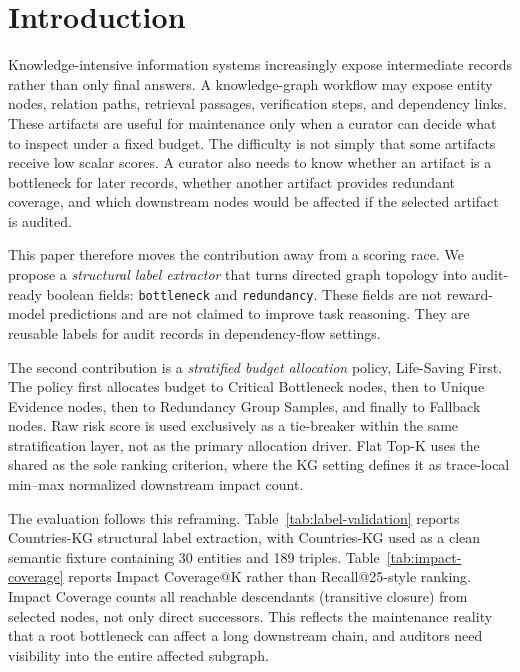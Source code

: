 \documentclass[pdflatex,sn-mathphys-num]{sn-jnl}
\begin{document}
\section{Introduction}\label{sec:introduction}

Knowledge-intensive information systems increasingly expose intermediate records rather than only final answers. A knowledge-graph workflow may expose entity nodes, relation paths, retrieval passages, verification steps, and dependency links. These artifacts are useful for maintenance only when a curator can decide what to inspect under a fixed budget. The difficulty is not simply that some artifacts receive low scalar scores. A curator also needs to know whether an artifact is a bottleneck for later records, whether another artifact provides redundant coverage, and which downstream nodes would be affected if the selected artifact is audited.

This paper therefore moves the contribution away from a scoring race. We propose a \emph{structural label extractor} that turns directed graph topology into audit-ready boolean fields: \texttt{bottleneck} and \texttt{redundancy}. These fields are not reward-model predictions and are not claimed to improve task reasoning. They are reusable labels for audit records in dependency-flow settings.

The second contribution is a \emph{stratified budget allocation} policy, Life-Saving First. The policy first allocates budget to Critical Bottleneck nodes, then to Unique Evidence nodes, then to Redundancy Group Samples, and finally to Fallback nodes. Raw risk score is used exclusively as a tie-breaker within the same stratification layer, not as the primary allocation driver. Flat Top-K uses the shared  as the sole ranking criterion, where the KG setting defines it as trace-local min--max normalized downstream impact count.

The evaluation follows this reframing. Table~\ref{tab:label-validation} reports Countries-KG structural label extraction, with Countries-KG used as a clean semantic fixture containing 30 entities and 189 triples. Table~\ref{tab:impact-coverage} reports Impact Coverage@K rather than Recall@25-style ranking. Impact Coverage counts all reachable descendants (transitive closure) from selected nodes, not only direct successors. This reflects the maintenance reality that a root bottleneck can affect a long downstream chain, and auditors need visibility into the entire affected subgraph.
\end{document}

